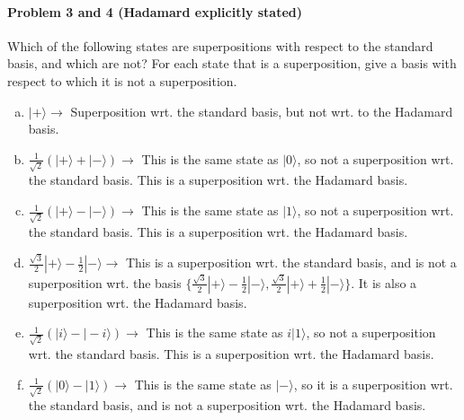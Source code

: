 \documentclass[12pt]{article}
\theoremstyle{mytheor}
\begin{document}
\paragraph{Problem 3 and 4 (Hadamard explicitly stated)} Which of the following states are superpositions with respect to the standard basis, and which are not? For each state that is a superposition, give a basis with respect to which it is not a superposition.
\begin{enumerate}[a)] %
\item $|+\rangle \rightarrow$ Superposition wrt. the standard basis, but not wrt. to the Hadamard basis.
\item $\frac{1}{\sqrt{2}}(|+\rangle + |-\rangle) \rightarrow$ This is the same state as $|0\rangle$, so not a superposition wrt. the standard basis. This is a superposition wrt. the Hadamard basis.
\item $\frac{1}{\sqrt{2}}(|+\rangle - |-\rangle) \rightarrow$ This is the same state as $|1\rangle$, so not a superposition wrt. the standard basis. This is a superposition wrt. the Hadamard basis.
\item $\frac{\sqrt{3}}{2}|+\rangle - \frac{1}{2}|-\rangle \rightarrow$ This is a superposition wrt. the standard basis, and is not a superposition wrt. the basis $\{\frac{\sqrt{3}}{2}|+\rangle - \frac{1}{2}|-\rangle,\frac{\sqrt{3}}{2}|+\rangle + \frac{1}{2}|-\rangle\}$. It is also a superposition wrt. the Hadamard basis.
\item $\frac{1}{\sqrt{2}}(|i\rangle - |-i\rangle) \rightarrow$ This is the same state as $i|1\rangle$, so not a superposition wrt. the standard basis. This is a superposition wrt. the Hadamard basis.
\item $\frac{1}{\sqrt{2}}(|0\rangle - |1\rangle) \rightarrow$ This is the same state as $|-\rangle$, so it is a superposition wrt. the standard basis, and is not a superposition wrt. the Hadamard basis.
\end{enumerate}
\end{document}

